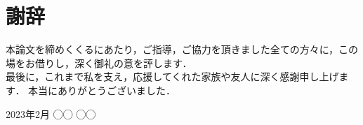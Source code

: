 \documentclass[../main]{subfiles}
\begin{document}
\chapter*{謝辞}
\label{thankyou}

\lhead[謝辞]{}
\thispagestyle{empty}

\newpage

本論文を締めくくるにあたり，ご指導，ご協力を頂きました全ての方々に，この場をお借りし，深く御礼の意を評します．
\\

最後に，これまで私を支え，応援してくれた家族や友人に深く感謝申し上げます．
本当にありがとうございました．

\begin{flushright}
  2023年2月 ◯◯ ◯◯
\end{flushright}
\end{document}
